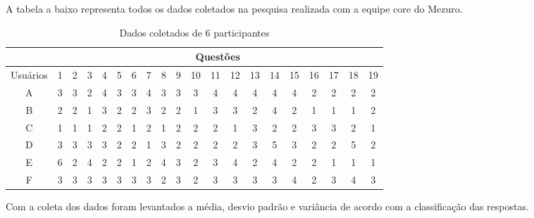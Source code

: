 A tabela a baixo representa todos os dados coletados na pesquisa realizada com a equipe core do Mezuro.

\begin{table}[h]
\begin{tabular}{|c|c|c|c|c|c|c|c|c|c|c|c|c|c|c|c|c|c|c|c|}
\hline
\multicolumn{1}{|l|}{} & \multicolumn{19}{c|}{Questões}                                                                         \\ \hline
Usuários& 1 & 2 & 3 & 4 & 5 & 6 & 7 & 8 & 9 & 10 & 11 & 12 & 13 & 14 & 15 & 16 & 17 & 18 & 19 \\ \hline
A                      & 3  & 3  & 2  & 4  & 3  & 3  & 4  & 3  & 3  & 3   & 4   & 4   & 4   & 4   & 4   & 2   & 2   & 2   & 2   \\ \hline
B                      & 2  & 2  & 1  & 3  & 2  & 2  & 3  & 2  & 2  & 1   & 3   & 3   & 2   & 4   & 2   & 1   & 1   & 1   & 2   \\ \hline
C                      & 1  & 1  & 1  & 2  & 2  & 1  & 2  & 1  & 2  & 2   & 2   & 1   & 3   & 2   & 2   & 3   & 3   & 2   & 1   \\ \hline
D                      & 3  & 3  & 3  & 3  & 2  & 2  & 1  & 3  & 2  & 2   & 2   & 2   & 3   & 5   & 3   & 2   & 2   & 5   & 2   \\ \hline
E                      & 6  & 2  & 4  & 2  & 2  & 1  & 2  & 4  & 3  & 2   & 3   & 4   & 2   & 4   & 2   & 2   & 1   & 1   & 1   \\ \hline
F                      & 3  & 3  & 3  & 3  & 3  & 3  & 3  & 2  & 3  & 2   & 3   & 3   & 3   & 3   & 4   & 2   & 3   & 4   & 3   \\ \hline
\end{tabular}
\caption{Dados coletados de 6 participantes}
\end{table}

Com a coleta dos dados foram levantados a média, desvio padrão e variância de acordo com a classificação das respostas. 

